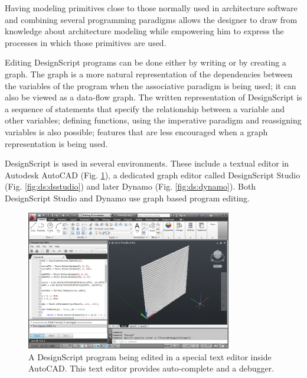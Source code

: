 \documentclass{./llncs2e/llncs}
\begin{document}
	Having modeling primitives close to those normally used in architecture software and combining several programming paradigms allows the designer to draw from knowledge about architecture modeling while empowering him to express the processes in which those primitives are used.
	
	Editing DesignScript programs can be done either by writing or by creating a graph. 
	The graph is a more natural representation of the dependencies between the variables of the program when the associative paradigm is being used; it can also be viewed as a data-flow graph. 
	The written representation of DesignScript is a sequence of statements that specify the relationship between a variable and other variables; defining functions, using the imperative paradigm and reassigning variables is also possible; features that are less encouraged when a graph representation is being used.
	
	DesignScript is used in several environments. 
	These include a textual editor in Autodesk AutoCAD (Fig. \ref{fig:ds:autocad}), a dedicated graph editor called DesignScript Studio (Fig. \ref{fig:ds:dsstudio}) and later Dynamo (Fig. \ref{fig:ds:dynamo}). 
	Both DesignScript Studio and Dynamo use graph based program editing.
	
	\begin{figure}
		\centering
		\includegraphics[width=0.8\textwidth]{img/ds_autocad}
		\caption{A DesignScript program being edited in a special text editor inside AutoCAD. This text editor provides auto-complete and a debugger.}
		\label{fig:ds:autocad}
	\end{figure} 
	
\end{document}
